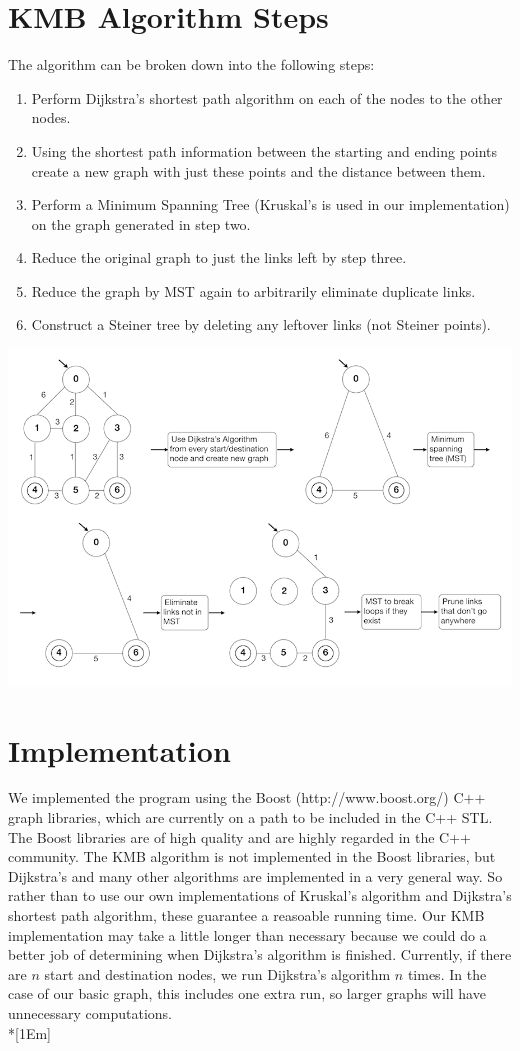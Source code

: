 \documentclass[titlepage,twoside,openright,12pt]{article}
\begin{document}
\begin{raggedright}
\section*{KMB Algorithm Steps}
The algorithm can be broken down into the following steps:
\begin{enumerate}
\item Perform Dijkstra's shortest path algorithm on each of the nodes to the other nodes.
\item Using the shortest path information between the starting and ending points create a new graph with just these points and the distance between them.
\item Perform a Minimum Spanning Tree (Kruskal's is used in our implementation) on the graph generated in step two.
\item Reduce the original graph to just the links left by step three.
\item Reduce the graph by MST again to arbitrarily eliminate duplicate links.
\item Construct a Steiner tree by deleting any leftover links (not Steiner points).
\end{enumerate}
\includegraphics{kmb.png}

\section*{Implementation}
We implemented the program using the Boost (http://www.boost.org/) C++ graph 
libraries, which are currently on a path to be included in the C++ STL. The Boost
libraries are of high quality and are highly regarded in the C++ community. The KMB 
algorithm is not implemented in the Boost libraries, but Dijkstra's and many 
other algorithms are implemented in a very general way. So rather than to use our own 
implementations of Kruskal's algorithm and Dijkstra's shortest path algorithm, 
these guarantee a reasoable running time. Our KMB implementation may take a 
little longer than necessary because we could do a better job of determining 
when Dijkstra's algorithm is finished. Currently, if there are $n$ start and destination 
nodes, we run Dijkstra's algorithm $n$ times. In the case of our basic graph, this includes
one extra run, so larger graphs will have unnecessary computations.\\*[1Em]


\end{raggedright}
\end{document}
